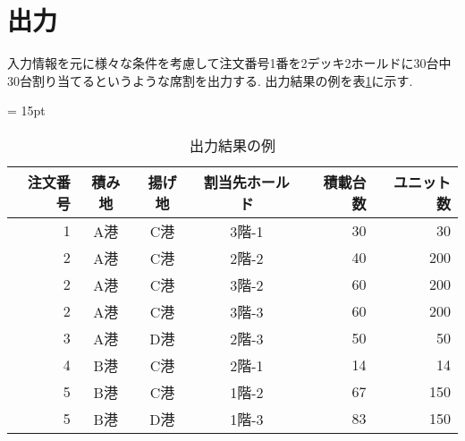 
\newpage

\section{出力}
入力情報を元に様々な条件を考慮して注文番号1番を2デッキ2ホールドに30台中30台割り当てるというような席割を出力する. 出力結果の例を表\ref{table23}に示す. \\

\begin{table}[htbp]
\centering
\tabcolsep = 15pt
\renewcommand{\arraystretch}{0.8}
\caption{出力結果の例}
\label{table23}
\begin{center}
\begin{tabular}{rcccrr} \hline
注文番号 & 積み地 & 揚げ地 & 割当先ホールド & 積載台数 & ユニット数 \\ \hline
1 & A港 & C港 & 3階-1 & 30 & 30 \\
2 & A港 & C港 & 2階-2 & 40 & 200 \\
2 & A港 & C港 & 3階-2 & 60 & 200 \\
2 & A港 & C港 & 3階-3 & 60 & 200 \\
3 & A港 & D港 & 2階-3 & 50 & 50 \\
4 & B港 & C港 & 2階-1 & 14 & 14 \\
5 & B港 & C港 & 1階-2 & 67 & 150 \\
5 & B港 & D港 & 1階-3 & 83 & 150 \\
\hline
\end{tabular}
\end{center}
\end{table}

